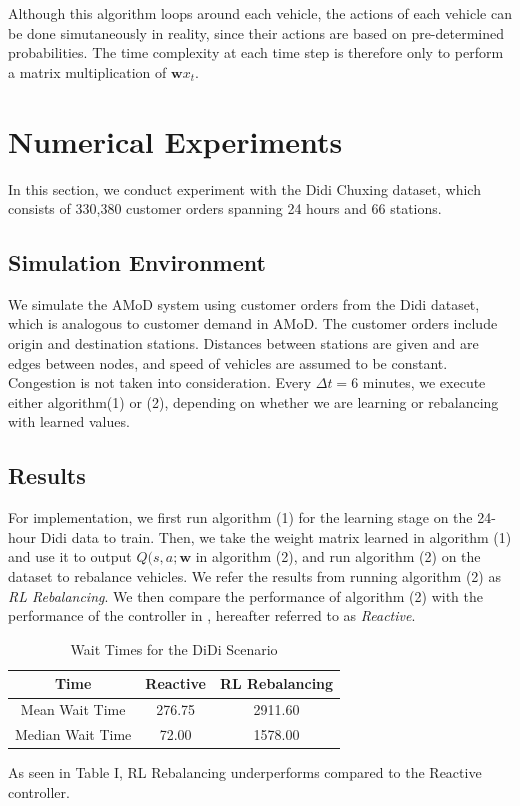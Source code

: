\documentclass[letterpaper, 10 pt, conference]{ieeeconf}  %
\begin{document}
Although this algorithm loops around each vehicle, the actions of each vehicle can be done simutaneously in reality, since their actions are based on pre-determined probabilities. The time complexity at each time step is therefore only to perform a matrix multiplication of $\textbf{w}x_t$.

\section{Numerical Experiments}
In this section, we conduct experiment with the Didi Chuxing dataset, which consists of 330,380 customer orders spanning 24 hours and 66 stations. 

\subsection{Simulation Environment}
We simulate the AMoD system using customer orders from the Didi dataset, which is analogous to customer demand in AMoD. The customer orders include origin and destination stations. Distances between stations are given and are edges between nodes, and speed of vehicles are assumed to be constant. Congestion is not taken into consideration. Every $\Delta t = 6$ minutes, we execute either algorithm(1) or (2), depending on whether we are learning or rebalancing with learned values. 

\subsection{Results}
For implementation, we first run algorithm (1) for the learning stage on the 24-hour Didi data to train. Then, we take the weight matrix learned in algorithm (1) and use it to output $Q(s,a;\textbf{w}$ in algorithm (2), and run algorithm (2) on the dataset to rebalance vehicles. We refer the results from running algorithm (2) as \textit{RL Rebalancing}. We then compare the performance of algorithm (2) with the performance of the controller in \cite{Zhang.ea:Reactive}, hereafter referred to as \textit{Reactive}. 
\begin{table}
\caption{Wait Times for the DiDi Scenario}
\begin{center}
\begin{tabular}{ |c|c|c| }
 \hline
 Time & Reactive & RL Rebalancing \\ 
 \hline
 Mean Wait Time & 276.75 & 2911.60 \\ 
 Median Wait Time & 72.00 & 1578.00 \\
 \hline
\end{tabular}
\end{center}
\end{table}
As seen in Table I, RL Rebalancing underperforms compared to the Reactive controller.\\
\end{document}
